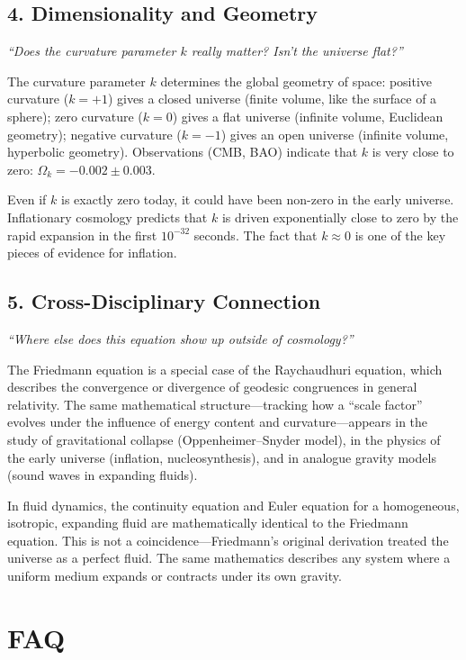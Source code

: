\documentclass[11pt,openright]{book}
\begin{document}
\subsection*{4. Dimensionality and Geometry}
\textit{``Does the curvature parameter $k$ really matter? Isn't the universe flat?''}

The curvature parameter $k$ determines the global geometry of space: positive curvature ($k = +1$) gives a closed universe (finite volume, like the surface of a sphere); zero curvature ($k = 0$) gives a flat universe (infinite volume, Euclidean geometry); negative curvature ($k = -1$) gives an open universe (infinite volume, hyperbolic geometry). Observations (CMB, BAO) indicate that $k$ is very close to zero: $\Omega_k = -0.002 \pm 0.003$.

Even if $k$ is exactly zero today, it could have been non-zero in the early universe. Inflationary cosmology predicts that $k$ is driven exponentially close to zero by the rapid expansion in the first $10^{-32}$ seconds. The fact that $k \approx 0$ is one of the key pieces of evidence for inflation.

\subsection*{5. Cross-Disciplinary Connection}
\textit{``Where else does this equation show up outside of cosmology?''}

The Friedmann equation is a special case of the Raychaudhuri equation, which describes the convergence or divergence of geodesic congruences in general relativity. The same mathematical structure---tracking how a ``scale factor'' evolves under the influence of energy content and curvature---appears in the study of gravitational collapse (Oppenheimer--Snyder model), in the physics of the early universe (inflation, nucleosynthesis), and in analogue gravity models (sound waves in expanding fluids).

In fluid dynamics, the continuity equation and Euler equation for a homogeneous, isotropic, expanding fluid are mathematically identical to the Friedmann equation. This is not a coincidence---Friedmann's original derivation treated the universe as a perfect fluid. The same mathematics describes any system where a uniform medium expands or contracts under its own gravity.

\section*{FAQ}
\end{document}
